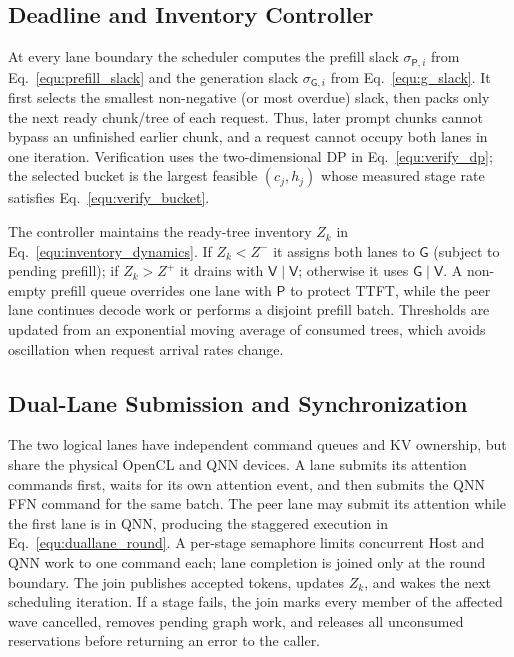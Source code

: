 \documentclass[sigconf,nonacm,10pt]{acmart}
\begin{document}
{{\subsection{Deadline and Inventory Controller}
At every lane boundary the scheduler computes the prefill slack
$\sigma_{\mathsf P,i}$ from Eq.~\eqref{equ:prefill_slack} and the generation
slack $\sigma_{\mathsf G,i}$ from Eq.~\eqref{equ:g_slack}.  It first selects
the smallest non-negative (or most overdue) slack, then packs only the next
ready chunk/tree of each request.  Thus, later prompt chunks cannot bypass an
unfinished earlier chunk, and a request cannot occupy both lanes in one
iteration.  Verification uses the two-dimensional DP in Eq.~\eqref{equ:verify_dp};
the selected bucket is the largest feasible $(c_j,h_j)$ whose measured stage
rate satisfies Eq.~\eqref{equ:verify_bucket}.

The controller maintains the ready-tree inventory $Z_k$ in Eq.~\eqref{equ:inventory_dynamics}.
If $Z_k<Z^-$ it assigns both lanes to $\mathsf G$ (subject to pending
prefill); if $Z_k>Z^+$ it drains with $\mathsf V\mid\mathsf V$; otherwise it
uses $\mathsf G\mid\mathsf V$.  A non-empty prefill queue overrides one lane
with $\mathsf P$ to protect TTFT, while the peer lane continues decode work or
performs a disjoint prefill batch.  Thresholds are updated from an exponential
moving average of consumed trees, which avoids oscillation when request
arrival rates change.

\subsection{Dual-Lane Submission and Synchronization}
The two logical lanes have independent command queues and KV ownership, but
share the physical OpenCL and QNN devices.  A lane submits its attention
commands first, waits for its own attention event, and then submits the QNN
FFN command for the same batch.  The peer lane may submit its attention while
the first lane is in QNN, producing the staggered execution in
Eq.~\eqref{equ:duallane_round}.  A per-stage semaphore limits concurrent Host
and QNN work to one command each; lane completion is joined only at the round
boundary.  The join publishes accepted tokens, updates $Z_k$, and wakes the
next scheduling iteration.  If a stage fails, the join marks every member of
the affected wave cancelled, removes pending graph work, and releases all
unconsumed reservations before returning an error to the caller.

}}
\end{document}
